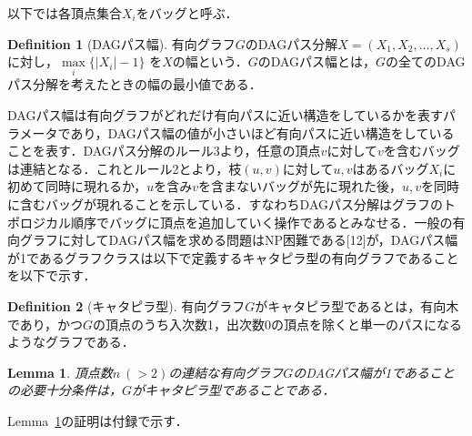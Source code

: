\documentclass[master]{kuisthesis}		%
\theoremstyle{plain}
\newtheorem{lemma}{Lemma}
\theoremstyle{definition}
\newtheorem{definition*}{Definition}
\begin{document}
以下では各頂点集合$X_i$をバッグと呼ぶ．

\begin{definition*}[DAGパス幅]
    有向グラフ$G$のDAGパス分解$X=(X_1, X_2,   \dots, X_s)$に対し，$ \underset{i}{\max} \{ |X_i|-1 \}$ を$X$の幅という．$G$のDAGパス幅とは，$G$の全てのDAGパス分解を考えたときの幅の最小値である．
\end{definition*}



DAGパス幅は有向グラフがどれだけ有向パスに近い構造をしているかを表すパラメータであり，DAGパス幅の値が小さいほど有向パスに近い構造をしていることを表す．DAGパス分解のルール3より，任意の頂点$v$に対して$v$を含むバッグは連結となる．これとルール2とより，枝$(u, v)$に対して$u, v$はあるバッグ$X_i$に初めて同時に現れるか，$u$を含み$v$を含まないバッグが先に現れた後，$u, v$を同時に含むバッグが現れることを示している．すなわちDAGパス分解はグラフのトポロジカル順序でバッグに頂点を追加していく操作であるとみなせる．一般の有向グラフに対してDAGパス幅を求める問題はNP困難である[12]が，DAGパス幅が1であるグラフクラスは以下で定義するキャタピラ型の有向グラフであることを以下で示す．

\begin{definition*}[キャタピラ型]
    有向グラフ$G$がキャタピラ型であるとは，有向木であり，かつ$G$の頂点のうち入次数1，出次数0の頂点を除くと単一のパスになるようなグラフである．
\end{definition*}


\begin{lemma}\label{catapillar}
    頂点数$n\ (>2)$の連結な有向グラフ$G$のDAGパス幅が1であることの必要十分条件は，$G$がキャタピラ型であることである．
\end{lemma}

Lemma~\ref{catapillar}の証明は付録で示す．
\end{document}
